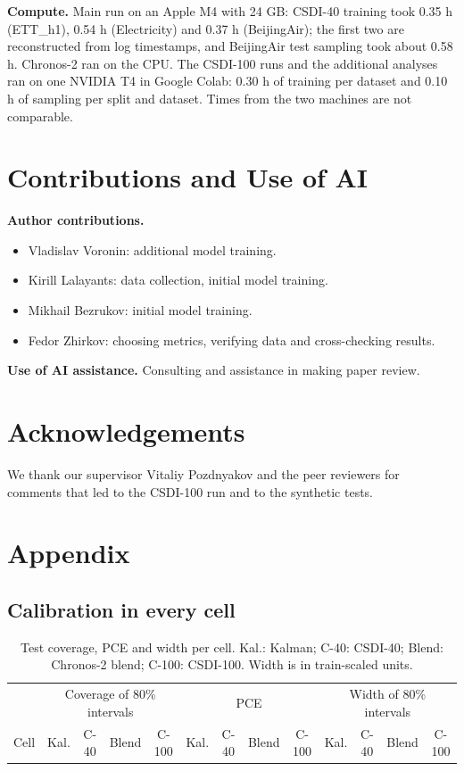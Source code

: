 \documentclass[10pt,twocolumn]{article}
\newcommand{\Chr}{Chronos-2}
\begin{document}
\textbf{Compute.} Main run on an Apple M4 with 24 GB: CSDI-40 training took 0.35 h (ETT\_h1), 0.54 h (Electricity) and 0.37 h (BeijingAir); the first two are reconstructed from log timestamps, and BeijingAir test sampling took about 0.58 h. \Chr{} ran on the CPU. The CSDI-100 runs and the additional analyses ran on one NVIDIA T4 in Google Colab: 0.30 h of training per dataset and 0.10 h of sampling per split and dataset. Times from the two machines are not comparable.

\section{Contributions and Use of AI}
\textbf{Author contributions.}
\begin{itemize}
\item Vladislav Voronin: additional model training.
\item Kirill Lalayants: data collection, initial model training.
\item Mikhail Bezrukov: initial model training.
\item Fedor Zhirkov: choosing metrics, verifying data and cross-checking results.
\end{itemize}

\textbf{Use of AI assistance.} Consulting and assistance in making paper review.

\section*{Acknowledgements}
We thank our supervisor Vitaliy Pozdnyakov and the peer reviewers for comments that led to the CSDI-100 run and to the synthetic tests.

{\small


}

\clearpage
\onecolumn
\appendix
\section{Appendix}
\subsection{Calibration in every cell}
\begin{table}[htbp]
\centering\footnotesize
\setlength{\tabcolsep}{3.2pt}
\begin{tabular}{@{}l cccc cccc cccc@{}}
\toprule
 & \multicolumn{4}{c}{Coverage of 80\% intervals} & \multicolumn{4}{c}{PCE} & \multicolumn{4}{c}{Width of 80\% intervals}\\
\cmidrule(lr){2-5}\cmidrule(lr){6-9}\cmidrule(l){10-13}
Cell & Kal. & C-40 & Blend & C-100 & Kal. & C-40 & Blend & C-100 & Kal. & C-40 & Blend & C-100\\
\midrule

\end{tabular}
\caption{Test coverage, PCE and width per cell. Kal.: Kalman; C-40: CSDI-40; Blend: \Chr{} blend; C-100: CSDI-100. Width is in train-scaled units.}
\label{tab:calib}
\end{table}
\end{document}

